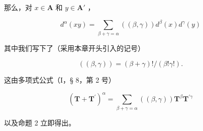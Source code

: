 那么，对 \(x \in \mathbf{A}\) 和 \(y \in \mathbf{A}'\) ，

\[
d ^ {\alpha} (x y) = \sum_ {\beta + \gamma = \alpha} ((\beta , \gamma)) d ^ {\beta} (x) d ^ {\gamma} (y)\tag{17}
\]

其中我们写下了（采用本章开头引入的记号）

\[
((\beta , \gamma)) = (\beta + \gamma)! / (\beta ! \gamma!).\tag{18}
\]

这由多项式公式（I，§ 8，第 2 号）

\[
(\mathbf {T} + \mathbf {T} ^ {\prime}) ^ {\alpha} = \sum_ {\beta + \gamma = \alpha} ((\beta , \gamma)) \mathbf {T} ^ {\beta} \mathbf {T} ^ {\prime \gamma}
\]

以及命题 2 立即得出。

